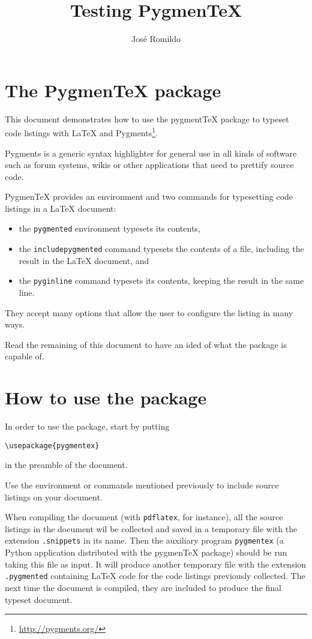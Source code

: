 \documentclass[10pt]{article}
\begin{document}
\title{Testing Pygmen\TeX}
\author{José Romildo}
\maketitle

\section{The Pygmen\TeX{} package}

This document demonstrates how to use the pygment\TeX{} package to typeset
code listings with \LaTeX{} and
Pygments\footnote{\url{http://pygments.org/}}.

Pygments is a generic syntax highlighter for general use in all kinds of
software such as forum systems, wikis or other applications that need to
prettify source code.

Pygmen\TeX{} provides an environment and two commands for typesetting code
listings in a \LaTeX{} document:
\begin{itemize}
  \item the \texttt{pygmented} environment typesets its contents,
  \item the \texttt{includepygmented} command typesets the contents of a
  file, including the result in the \LaTeX{} document, and
  \item the \texttt{pyginline} command typesets its contents, keeping
  the result in the same line.
\end{itemize}
They accept many options that allow the user to configure the listing in
many ways.

Read the remaining of this document to have an ided of what the package
is capable of.

\section{How to use the package}

In order to use the package, start by putting
\begin{verbatim}
\usepackage{pygmentex}
\end{verbatim}
in the preamble of the document.

Use the environment or commands mentioned previously to include source
listings on your document.

When compiling the document (with \texttt{pdflatex}, for instance), all
the source listings in the document wil be collected and saved in a
temporary file with the extension \texttt{.snippets} in its name. Then
the auxiliary program \texttt{pygmentex} (a Python application
distributed with the pygmen\TeX{} package) should be run taking this
file as input. It will produce another temporary file with the extension
\texttt{.pygmented} containing \LaTeX{} code for the code listings
previously collected. The next time the document is compiled, they are
included to produce the final typeset document.
\end{document}
